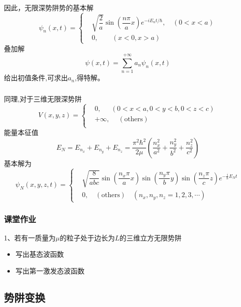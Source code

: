 \begin{frame} 
	\frametitle{}
因此，无限深势阱势的基本解
	\[ \boxed{ \psi _n (x,t)=\left\{
	\begin{aligned}
		& \sqrt{\dfrac{2}{a}}\sin(\dfrac{n\pi}{a}x) e^{-iE_nt/\hbar}, \quad (0 < x < a) \\ 
		& 0, \quad \quad ( x < 0, x > a)
	\end{aligned} \right.}
	\]
叠加解
\[ \psi(x,t) = \sum_{n=1} ^{+\infty} a_n \psi _n (x,t)
\]	
给出初值条件,可求出$a_n$,得特解。 
\end{frame} 

\begin{frame}
  \frametitle{}
同理,对于三维无限深势阱
$$ \displaystyle 
      V(x,y,z)=\left\{ 
      \begin{aligned}
          &0, ~~\quad (0 < x < a, 0 < y < b,0 < z < c) \\  
          &+\infty,\quad~ ( \text{others})\\
      \end{aligned}
      \right.
  $$
能量本征值
\[E_{N} = E_{n_x} +E_{n_y} + E_{n_z} = \dfrac{\pi^2\hbar^2}{2\mu } (\frac{n_x^2}{a^2} + \frac{n_y^2}{b^2} + \frac{n_z^2}{c^2}) \]
基本解为
\[ \boxed{ \psi _N (x,y,z,t)=\left\{
\begin{aligned}
    & \sqrt{\dfrac{8}{abc}}\sin(\dfrac{n_x\pi}{a}x)\sin(\dfrac{n_y\pi}{b}y) \sin(\dfrac{n_z\pi}{c}z)e^{-\frac{i}{\hbar}E_{N} t} \\ 
    & 0, \quad  ( \text{others}) \quad (n_x, n_y, n_z = 1, 2, 3, \cdots )
\end{aligned} \right.}
\]
\end{frame} 

\begin{frame}[label=current]
  \frametitle{课堂作业}
  1、若有一质量为$\mu$的粒子处于边长为$L$的三维立方无限势阱
  \begin{itemize}
    \item 写出基态波函数
    \item 写出第一激发态波函数
  \end{itemize}
\end{frame} 

\subsection{势阱变换}

